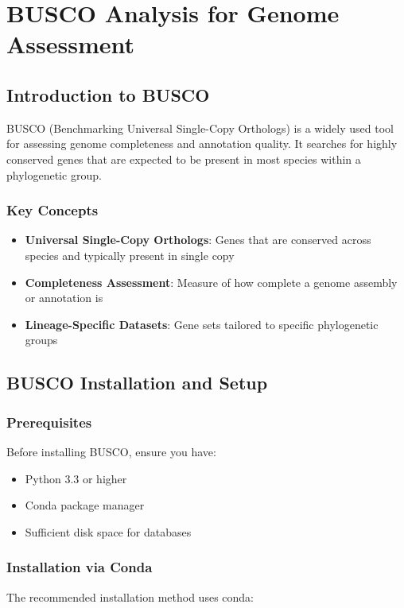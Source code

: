 
\section{BUSCO Analysis for Genome Assessment}

\subsection{Introduction to BUSCO}

BUSCO (Benchmarking Universal Single-Copy Orthologs) is a widely used tool for assessing genome completeness and annotation quality. It searches for highly conserved genes that are expected to be present in most species within a phylogenetic group.

\subsubsection{Key Concepts}
\begin{itemize}
    \item \textbf{Universal Single-Copy Orthologs}: Genes that are conserved across species and typically present in single copy
    \item \textbf{Completeness Assessment}: Measure of how complete a genome assembly or annotation is
    \item \textbf{Lineage-Specific Datasets}: Gene sets tailored to specific phylogenetic groups
\end{itemize}

\subsection{BUSCO Installation and Setup}

\subsubsection{Prerequisites}
Before installing BUSCO, ensure you have:
\begin{itemize}
    \item Python 3.3 or higher
    \item Conda package manager
    \item Sufficient disk space for databases
\end{itemize}

\subsubsection{Installation via Conda}
The recommended installation method uses conda:

